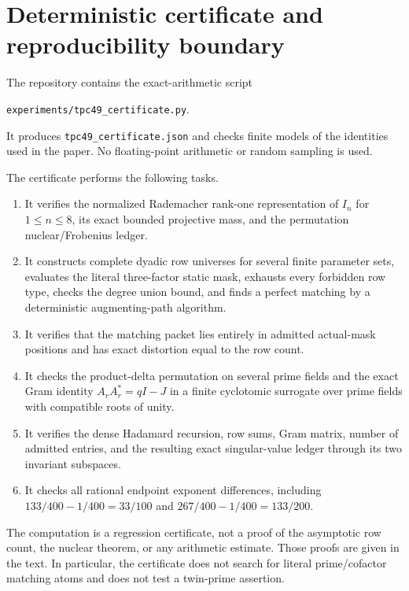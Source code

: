 \section{Deterministic certificate and reproducibility boundary}
\label{sec:tpc49-certificate}

The repository contains the exact-arithmetic script
\begin{center}
\texttt{experiments/tpc49\_certificate.py}.
\end{center}
It produces \texttt{tpc49\_certificate.json} and checks finite models
of the identities used in the paper.  No floating-point arithmetic or
random sampling is used.

The certificate performs the following tasks.
\begin{enumerate}[label=\textup{(\roman*)},leftmargin=2.4em]
 \item It verifies the normalized Rademacher rank-one representation of
       \(I_n\) for \(1\le n\le8\), its exact bounded projective mass,
       and the permutation nuclear/Frobenius ledger.
 \item It constructs complete dyadic row universes for several finite
       parameter sets, evaluates the literal three-factor static mask,
       exhausts every forbidden row type, checks the degree union bound,
       and finds a perfect matching by a deterministic augmenting-path
       algorithm.
 \item It verifies that the matching packet lies entirely in admitted
       actual-mask positions and has exact distortion equal to the row
       count.
 \item It checks the product-delta permutation on several prime fields
       and the exact Gram identity
       \(A_rA_r^*=qI-J\) in a finite cyclotomic surrogate over prime
       fields with compatible roots of unity.
 \item It verifies the dense Hadamard recursion, row sums, Gram matrix,
       number of admitted entries, and the resulting exact singular-value
       ledger through its two invariant subspaces.
 \item It checks all rational endpoint exponent differences, including
       \(133/400-1/400=33/100\) and
       \(267/400-1/400=133/200\).
\end{enumerate}

The computation is a regression certificate, not a proof of the
asymptotic row count, the nuclear theorem, or any arithmetic estimate.
Those proofs are given in the text.  In particular, the certificate
does not search for literal prime/cofactor matching atoms and does not
test a twin-prime assertion.

